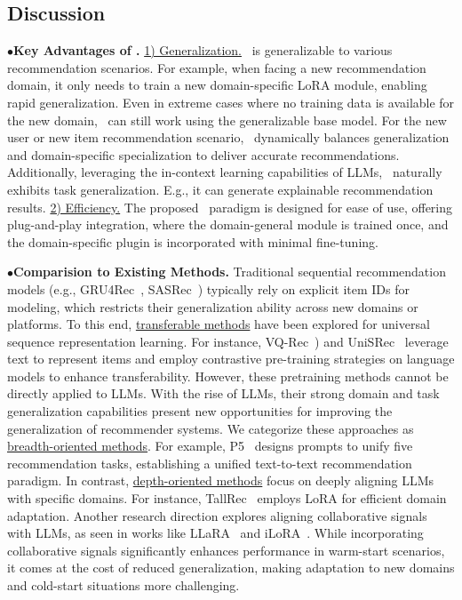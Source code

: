 \subsection{Discussion}
\noindent$\bullet$\quad\textbf{Key Advantages of \shortname.} 
\underline{1) Generalization.}
\shortname~is generalizable to various recommendation scenarios.
For example, when facing a new recommendation domain, it only needs to train a new domain-specific LoRA module, enabling rapid generalization. Even in extreme cases where no training data is available for the new domain, \shortname~can still work using the generalizable base model. For the new user or new item recommendation scenario, \shortname~dynamically balances generalization and domain-specific specialization to deliver accurate recommendations.
Additionally, leveraging the in-context learning capabilities of LLMs, \shortname~naturally exhibits task generalization. E.g., it can generate explainable recommendation results.
\underline{2) Efficiency.}
The proposed \shortname~paradigm is designed for ease of use, offering plug-and-play integration, where the domain-general module is trained once, and the domain-specific plugin is incorporated with minimal fine-tuning. 

\noindent$\bullet$\quad\textbf{Comparision to Existing Methods.}
Traditional sequential recommendation models (e.g., GRU4Rec~\cite{DBLP:journals/corr/HidasiKBT15}, SASRec~\cite{kang2018self}) typically rely on explicit item IDs for modeling, which restricts their generalization ability across new domains or platforms. To this end, \underline{transferable methods} have been explored for universal sequence representation learning. For instance, VQ-Rec~\cite{10.1145/3543507.3583434}) and UniSRec~\cite{hou2022towards} leverage text to represent items and employ contrastive pre-training strategies on language models to enhance transferability.
However, these pretraining methods cannot be directly applied to LLMs.
With the rise of LLMs, their strong domain and task generalization capabilities present new opportunities for improving the generalization of recommender systems. We categorize these approaches as \underline{breadth-oriented methods}. For example, P5~\cite{geng2022recommendation} designs prompts to unify five recommendation tasks, establishing a unified text-to-text recommendation paradigm.
In contrast, \underline{depth-oriented methods} focus on deeply aligning LLMs with specific domains. For instance, TallRec~\cite{bao2023tallrec} employs LoRA for efficient domain adaptation. Another research direction explores aligning collaborative signals with LLMs, as seen in works like LLaRA~\cite{10.1145/3626772.3657690} and iLoRA~\cite{kong2024customizing}. While incorporating collaborative signals significantly enhances performance in warm-start scenarios, it comes at the cost of reduced generalization, making adaptation to new domains and cold-start situations more challenging.



